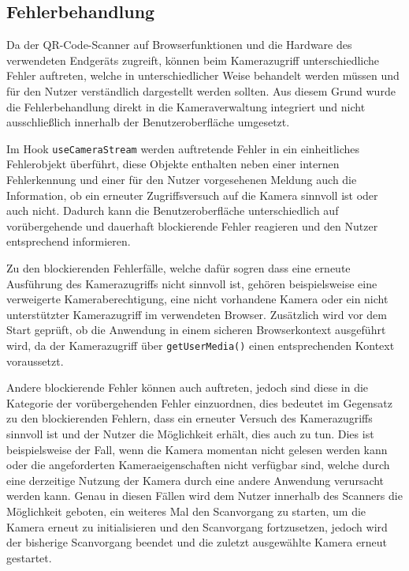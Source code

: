 ﻿\documentclass[oneside]{ausarbeitung}
\begin{document}
\subsection{Fehlerbehandlung}
\label{sec:scanner-fehlerbehandlung}

Da der QR-Code-Scanner auf Browserfunktionen und die Hardware des verwendeten Endgeräts zugreift, können beim Kamerazugriff unterschiedliche Fehler
auftreten, welche in unterschiedlicher Weise behandelt werden müssen und für den Nutzer verständlich dargestellt werden sollten. Aus diesem Grund
wurde die Fehlerbehandlung direkt in die Kameraverwaltung integriert und nicht ausschließlich innerhalb der Benutzeroberfläche umgesetzt.

Im Hook \texttt{useCameraStream} werden auftretende Fehler in ein einheitliches Fehlerobjekt überführt, diese Objekte enthalten neben einer internen 
Fehlerkennung und einer für den Nutzer vorgesehenen Meldung auch die Information, ob ein erneuter Zugriffsversuch auf die Kamera sinnvoll ist oder 
auch nicht. Dadurch kann die Benutzeroberfläche unterschiedlich auf vorübergehende und dauerhaft blockierende Fehler reagieren und den Nutzer
entsprechend informieren.

Zu den blockierenden Fehlerfälle, welche dafür sogren dass eine erneute Ausführung des Kamerazugriffs nicht sinnvoll ist, gehören beispielsweise 
eine verweigerte Kameraberechtigung, eine nicht vorhandene Kamera oder ein nicht unterstützter Kamerazugriff im verwendeten Browser. Zusätzlich 
wird vor dem Start geprüft, ob die Anwendung in einem sicheren Browserkontext ausgeführt wird, da der Kamerazugriff über \texttt{getUserMedia()} 
einen entsprechenden Kontext voraussetzt.

Andere blockierende Fehler können auch auftreten, jedoch sind diese in die Kategorie der vorübergehenden Fehler einzuordnen, dies bedeutet im
Gegensatz zu den blockierenden Fehlern, dass ein erneuter Versuch des Kamerazugriffs sinnvoll ist und der Nutzer die Möglichkeit erhält,
dies auch zu tun. Dies ist beispielsweise der Fall, wenn die Kamera momentan nicht gelesen werden kann oder die angeforderten Kameraeigenschaften
nicht verfügbar sind, welche durch eine derzeitige Nutzung der Kamera durch eine andere Anwendung verursacht werden kann. Genau in diesen Fällen
wird dem Nutzer innerhalb des Scanners die Möglichkeit geboten, ein weiteres Mal den Scanvorgang zu starten, um die Kamera erneut zu initialisieren 
und den Scanvorgang fortzusetzen, jedoch wird der bisherige Scanvorgang beendet und die zuletzt ausgewählte Kamera erneut gestartet.
\end{document}
